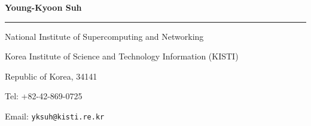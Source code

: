 \documentclass{letter} %
\begin{document}
\signature{Young-Kyoon Suh}           %
\longindentation=0pt                       %
\let\raggedleft\raggedright                %
 
\begin{letter}{
%
}

\begin{flushleft}
{\large\bf Young-Kyoon Suh}
\end{flushleft}
\medskip\hrule height 1pt
\begin{flushright}
\hfill National Institute of Supercomputing and Networking
\end{flushright}
\vspace{-.15in}
\begin{flushright}
\hfill Korea Institute of Science and Technology Information (KISTI)
\end{flushright}
\vspace{-.15in}
\begin{flushright}
\hfill Republic of Korea, 34141
\end{flushright}
\vspace{-.15in}
\begin{flushright}
\hfill Tel: +82-42-869-0725
\end{flushright}
\vspace{-.15in}
\begin{flushright}
\hfill Email: {\tt yksuh@kisti.re.kr}
\end{flushright} 


\end{letter}
\end{document}
